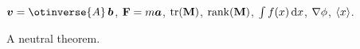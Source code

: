\documentclass{article}
\begin{document}
$\vect{v} = \otinverse{A}\,\vect{b}$, $\mathbf{F} = m\boldsymbol{a}$,
$\operatorname{tr}(\mathbf{M})$, $\operatorname{rank}(\mathbf{M})$, $\int f(x)\,\mathrm{d} x$, $\nabla\phi$,
$\left\langle x \right\rangle$.
\begin{otplainthm}A neutral theorem.\end{otplainthm}
\end{document}
